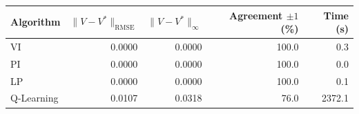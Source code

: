 \begin{tabular}{lrrrr}
\hline
Algorithm & $\|V{-}V^*\|_\mathrm{RMSE}$ & $\|V{-}V^*\|_\infty$ & Agreement $\pm 1$ (\%) & Time (s) \\
\hline
VI & 0.0000 & 0.0000 & 100.0 & 0.3 \\
PI & 0.0000 & 0.0000 & 100.0 & 0.0 \\
LP & 0.0000 & 0.0000 & 100.0 & 0.1 \\
Q-Learning & 0.0107 & 0.0318 & 76.0 & 2372.1 \\
\hline
\end{tabular}